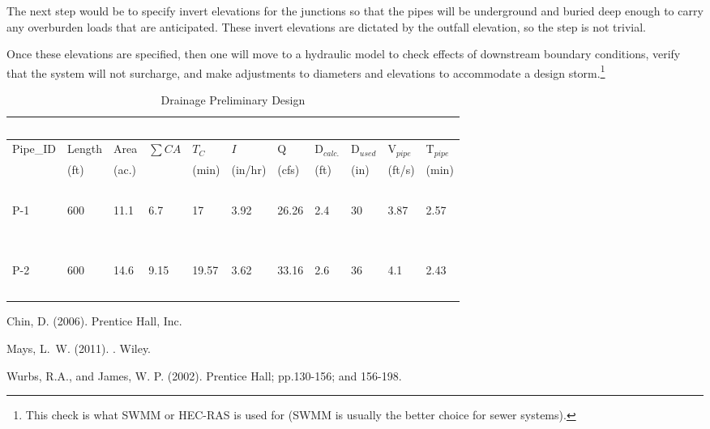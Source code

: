 \documentclass[12pt]{article}
\begin{document}
The next step would be to specify invert elevations for the junctions so that the pipes will be underground and buried deep enough to carry any overburden loads that are anticipated.  
These invert elevations are dictated by the outfall elevation, so the step is not trivial.  

Once these elevations are specified, then one will move to a hydraulic model to check effects of downstream boundary conditions, verify that the system will not surcharge, and make adjustments to diameters and elevations to accommodate a design storm.\footnote{This check is what SWMM or HEC-RAS is used for (SWMM is usually the better choice for sewer systems).}


\begin{table}[h!]
   \centering
   \caption{Drainage Preliminary Design}
   \begin{tabular}{p{0.5in}p{0.5in}p{0.4in}p{0.4in}p{0.4in}p{0.4in}p{0.5in}p{0.5in}p{0.4in}p{0.4in}p{0.4in}} %
   ~ & ~ & ~ & ~ & ~ & \\
   \hline
   \hline
      Pipe\_ID & Length & Area & $\sum CA$ & $T_C$ & $I$ & Q  & D$_{calc.}$ &  D$_{used}$ & V$_{pipe}$  & 
  T$_{pipe}$ \\
        ~ &  (ft) &  (ac.) & ~&  (min) &  (in/hr) &  (cfs) & (ft) &  (in) &  (ft/s) & 
   (min) \\
      \hline
               ~ &  ~ &  ~ & ~&  ~ &  ~ &  ~& ~ &  ~ &  ~ & ~ \\
         P-1 &  600 &  11.1 & 6.7 & 17 &  3.92 &  26.26 & 2.4 & 30 & 3.87 & 2.57 \\
         ~ &  ~ &  ~ & ~&  ~ &  ~ &  ~& ~ &  ~ &  ~ & ~ \\
         \hline
                           ~ &  ~ &  ~ & ~&  ~ &  ~ &  ~& ~ &  ~ &  ~ & ~ \\
         P-2 &  600 &  14.6 & 9.15 &  19.57 & 3.62 & 33.16 & 2.6 & 36 & 4.1 & 2.43 \\ 
                  ~ &  ~ &  ~ & ~&  ~ &  ~ &  ~& ~ &  ~ &  ~ & ~ \\
      \hline
      \hline
   \end{tabular}
   \label{tab:designpipes}
\end{table}

\begin{thebibliography}{}
Chin, D. (2006). 
\newblock Prentice Hall, Inc.

Mays, L.~W. (2011).
.
\newblock Wiley.

Wurbs, R.A., and James, W. P. (2002).
\newblock Prentice Hall; pp.130-156; and 156-198. 

\end{thebibliography}
\end{document}
